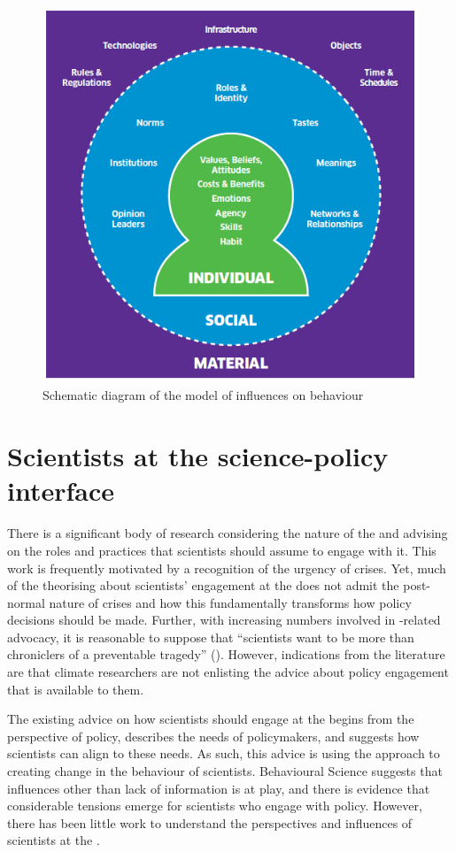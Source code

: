 \begin{figure}
    \centering
    \includegraphics[width=0.5\linewidth]{figures/ism.png}
    \caption{Schematic diagram of the \ISM{} model of influences on behaviour}
    \label{fig:ism}
\end{figure}

\section{Scientists at the science-policy interface}\label{sec:litjust}

There is a significant body of research considering the nature of the \SPI{} and advising on the roles and practices that scientists should assume to engage with it. This work is frequently motivated by a recognition of the urgency of \CAN{} crises. Yet, much of the theorising about scientists' engagement at the \SPI{} does not admit the post-normal nature of \CAN{} crises and how this fundamentally transforms how policy decisions should be made. Further, with increasing numbers involved in \CAN-related advocacy, it is reasonable to suppose that ``scientists want to be more than chroniclers of a preventable tragedy'' (\cite{WyattGT2024}). However, indications from the literature are that climate researchers are not enlisting the advice about policy engagement that is available to them.

The existing advice on how scientists should engage at the \SPI{} begins from the perspective of policy, describes the needs of policymakers, and suggests how scientists can align to these needs. As such, this advice is using the \IDM{} approach to creating change in the behaviour of scientists. Behavioural Science suggests that influences other than lack of information is at play, and there is evidence that considerable tensions emerge for scientists who engage with policy. However, there has been little work to understand the perspectives and influences of scientists at the \SPI. 
